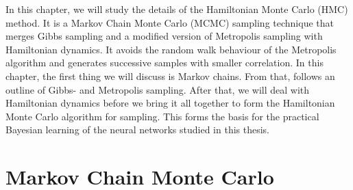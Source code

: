 In this chapter, we will study the details of the Hamiltonian Monte Carlo (HMC) method.
It is a Markov Chain Monte Carlo (MCMC) sampling technique that merges Gibbs sampling and a modified version of Metropolis sampling
with Hamiltonian dynamics. It avoids the random walk behaviour of the Metropolis algorithm
and generates successive samples with smaller correlation. In this chapter, the first thing we will discuss is Markov chains.
From that, follows an outline of Gibbs- and Metropolis sampling. After that, we will deal with Hamiltonian dynamics before we bring it all together
to form the Hamiltonian Monte Carlo algorithm for sampling. This forms the basis for the practical Bayesian learning of the neural networks studied in this thesis.

\section{Markov Chain Monte Carlo}\label{sec:mcmc}
\begin{comment}
  The treatment of Markov chains largely follows the presentation in \cite{markov_chains}. A Markov process is a scheme that from a given state (or value) $\mu$ generates a new state $\nu$ with a \textit{transition} probability $T(\nu|\mu)$. A Markov process has the following properties
\begin{itemize}
  \item The transition probabilities $T(\nu|\mu)$ are time-independent.
  \item $T(\nu|\mu)$ only depend on the states $\mu$ and $\nu$.
  \item The transition $\mu \to \mu$ is allowed, thus $T(\mu|\mu) > 0$. Hence, the new generated state may just be the same as the previous state.
  \item The transition probabilties must sum to unity, hence $\int_{\nu} T(\nu|\mu) = 1$. In other words, the procedure must generate some new state.
\end{itemize}

Two important principles, originally found by Metropolis et. al \cite{metropolis}, were introduced to make the MCMC chains computationally feasible. 
\begin{enumerate}
  \item \textbf{Ergodicity}: Any state $\nu$ can be reached from any other state $\mu$ given a long enough MCMC chain.
  \item \textbf{Detailed balance}: If the transition probabilities $T(\nu|\mu)$ obey the detailed balance equation, $$P(\mu)T(\nu|\mu) = P(\nu)T(\mu|\nu),$$
      then the Markov chain is guaranteed to be ergodic. The interpretation of this is that on average, the system makes the transition $\mu \to \nu$ just as often as the transition $\nu \to \mu$.
\end{enumerate}
\end{comment}

